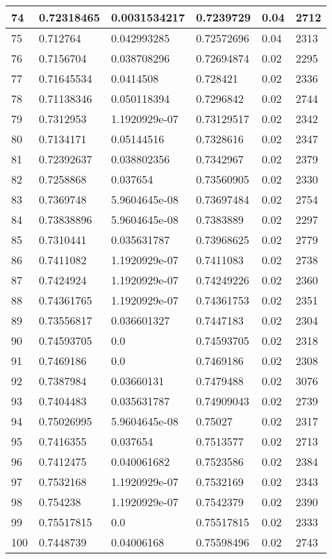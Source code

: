 \begin{longtable}{|l|l|l|l|l|l|}
74 & 0.72318465 & 0.0031534217 & 0.7239729 & 0.04 & 2712 \\ \hline 
75 & 0.712764 & 0.042993285 & 0.72572696 & 0.04 & 2313 \\ \hline 
76 & 0.7156704 & 0.038708296 & 0.72694874 & 0.02 & 2295 \\ \hline 
77 & 0.71645534 & 0.0414508 & 0.728421 & 0.02 & 2336 \\ \hline 
78 & 0.71138346 & 0.050118394 & 0.7296842 & 0.02 & 2744 \\ \hline 
79 & 0.7312953 & 1.1920929e-07 & 0.73129517 & 0.02 & 2342 \\ \hline 
80 & 0.7134171 & 0.05144516 & 0.7328616 & 0.02 & 2347 \\ \hline 
81 & 0.72392637 & 0.038802356 & 0.7342967 & 0.02 & 2379 \\ \hline 
82 & 0.7258868 & 0.037654 & 0.73560905 & 0.02 & 2330 \\ \hline 
83 & 0.7369748 & 5.9604645e-08 & 0.73697484 & 0.02 & 2754 \\ \hline 
84 & 0.73838896 & 5.9604645e-08 & 0.7383889 & 0.02 & 2297 \\ \hline 
85 & 0.7310441 & 0.035631787 & 0.73968625 & 0.02 & 2779 \\ \hline 
86 & 0.7411082 & 1.1920929e-07 & 0.7411083 & 0.02 & 2738 \\ \hline 
87 & 0.7424924 & 1.1920929e-07 & 0.74249226 & 0.02 & 2360 \\ \hline 
88 & 0.74361765 & 1.1920929e-07 & 0.74361753 & 0.02 & 2351 \\ \hline 
89 & 0.73556817 & 0.036601327 & 0.7447183 & 0.02 & 2304 \\ \hline 
90 & 0.74593705 & 0.0 & 0.74593705 & 0.02 & 2318 \\ \hline 
91 & 0.7469186 & 0.0 & 0.7469186 & 0.02 & 2308 \\ \hline 
92 & 0.7387984 & 0.03660131 & 0.7479488 & 0.02 & 3076 \\ \hline 
93 & 0.7404483 & 0.035631787 & 0.74909043 & 0.02 & 2739 \\ \hline 
94 & 0.75026995 & 5.9604645e-08 & 0.75027 & 0.02 & 2317 \\ \hline 
95 & 0.7416355 & 0.037654 & 0.7513577 & 0.02 & 2713 \\ \hline 
96 & 0.7412475 & 0.040061682 & 0.7523586 & 0.02 & 2384 \\ \hline 
97 & 0.7532168 & 1.1920929e-07 & 0.7532169 & 0.02 & 2343 \\ \hline 
98 & 0.754238 & 1.1920929e-07 & 0.7542379 & 0.02 & 2390 \\ \hline 
99 & 0.75517815 & 0.0 & 0.75517815 & 0.02 & 2333 \\ \hline 
100 & 0.7448739 & 0.04006168 & 0.75598496 & 0.02 & 2743 \\ \hline 
\end{longtable}